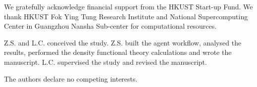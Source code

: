 \documentclass[pdflatex,sn-nature]{sn-jnl}%
\begin{document}
\begingroup
\linespread{1.60}\selectfont
{}
{}

\endgroup

We gratefully acknowledge financial support from the HKUST Start-up Fund. We thank HKUST
Fok Ying Tung Research Institute and National Supercomputing Center in Guangzhou Nansha
Sub-center for computational resources.

Z.S. and L.C. conceived the study. Z.S. built the agent workflow, analysed the results,
performed the density functional theory calculations and wrote the manuscript. L.C.
supervised the study and revised the manuscript.

 The authors declare no competing interests.
\end{document}
